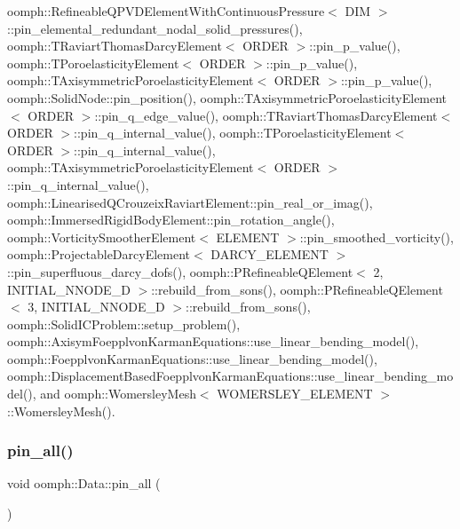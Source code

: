 oomph\+::\+Refineable\+Q\+P\+V\+D\+Element\+With\+Continuous\+Pressure$<$ D\+I\+M $>$\+::pin\+\_\+elemental\+\_\+redundant\+\_\+nodal\+\_\+solid\+\_\+pressures(), oomph\+::\+T\+Raviart\+Thomas\+Darcy\+Element$<$ O\+R\+D\+E\+R $>$\+::pin\+\_\+p\+\_\+value(), oomph\+::\+T\+Poroelasticity\+Element$<$ O\+R\+D\+E\+R $>$\+::pin\+\_\+p\+\_\+value(), oomph\+::\+T\+Axisymmetric\+Poroelasticity\+Element$<$ O\+R\+D\+E\+R $>$\+::pin\+\_\+p\+\_\+value(), oomph\+::\+Solid\+Node\+::pin\+\_\+position(), oomph\+::\+T\+Axisymmetric\+Poroelasticity\+Element$<$ O\+R\+D\+E\+R $>$\+::pin\+\_\+q\+\_\+edge\+\_\+value(), oomph\+::\+T\+Raviart\+Thomas\+Darcy\+Element$<$ O\+R\+D\+E\+R $>$\+::pin\+\_\+q\+\_\+internal\+\_\+value(), oomph\+::\+T\+Poroelasticity\+Element$<$ O\+R\+D\+E\+R $>$\+::pin\+\_\+q\+\_\+internal\+\_\+value(), oomph\+::\+T\+Axisymmetric\+Poroelasticity\+Element$<$ O\+R\+D\+E\+R $>$\+::pin\+\_\+q\+\_\+internal\+\_\+value(), oomph\+::\+Linearised\+Q\+Crouzeix\+Raviart\+Element\+::pin\+\_\+real\+\_\+or\+\_\+imag(), oomph\+::\+Immersed\+Rigid\+Body\+Element\+::pin\+\_\+rotation\+\_\+angle(), oomph\+::\+Vorticity\+Smoother\+Element$<$ E\+L\+E\+M\+E\+N\+T $>$\+::pin\+\_\+smoothed\+\_\+vorticity(), oomph\+::\+Projectable\+Darcy\+Element$<$ D\+A\+R\+C\+Y\+\_\+\+E\+L\+E\+M\+E\+N\+T $>$\+::pin\+\_\+superfluous\+\_\+darcy\+\_\+dofs(), oomph\+::\+P\+Refineable\+Q\+Element$<$ 2, I\+N\+I\+T\+I\+A\+L\+\_\+\+N\+N\+O\+D\+E\+\_\+D $>$\+::rebuild\+\_\+from\+\_\+sons(), oomph\+::\+P\+Refineable\+Q\+Element$<$ 3, I\+N\+I\+T\+I\+A\+L\+\_\+\+N\+N\+O\+D\+E\+\_\+D $>$\+::rebuild\+\_\+from\+\_\+sons(), oomph\+::\+Solid\+I\+C\+Problem\+::setup\+\_\+problem(), oomph\+::\+Axisym\+Foepplvon\+Karman\+Equations\+::use\+\_\+linear\+\_\+bending\+\_\+model(), oomph\+::\+Foepplvon\+Karman\+Equations\+::use\+\_\+linear\+\_\+bending\+\_\+model(), oomph\+::\+Displacement\+Based\+Foepplvon\+Karman\+Equations\+::use\+\_\+linear\+\_\+bending\+\_\+model(), and oomph\+::\+Womersley\+Mesh$<$ W\+O\+M\+E\+R\+S\+L\+E\+Y\+\_\+\+E\+L\+E\+M\+E\+N\+T $>$\+::\+Womersley\+Mesh().

\mbox{\label{classoomph_1_1Data_a16277ea5b41cd9b09739b21a379d7eb4}} 
\subsubsection{\texorpdfstring{pin\+\_\+all()}{pin\_all()}}
{\footnotesize\ttfamily void oomph\+::\+Data\+::pin\+\_\+all (\begin{DoxyParamCaption}{ }\end{DoxyParamCaption})\hspace{0.3cm}{\ttfamily [inline]}}



